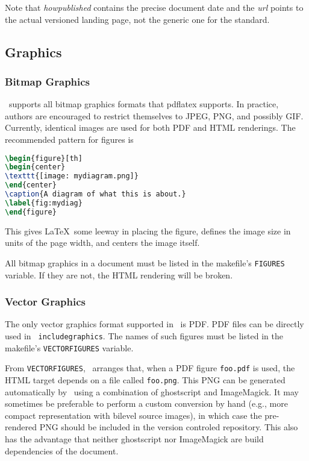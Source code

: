 \documentclass[11pt,a4paper]{ivoa}
\newcommand{\texword}[1]{\texttt{\color{texcolor} #1}}
\begin{document}
Note that \emph{howpublished} contains the precise document date and the
\emph{url} points to the actual versioned landing page, not the generic
one for the standard.

\subsection{Graphics}

\subsubsection{Bitmap Graphics}

\ivoatex\ supports all bitmap graphics formats that pdflatex supports.
In practice, authors are encouraged to restrict themselves to JPEG, PNG,
and possibly GIF.  Currently, identical images are used for both PDF and
HTML renderings.  The recommended pattern for figures is
\begin{lstlisting}[language=tex]
\begin{figure}[th]
\begin{center}
\texttt{[image: mydiagram.png]}
\end{center}
\caption{A diagram of what this is about.}
\label{fig:mydiag}
\end{figure}
\end{lstlisting}
This gives \LaTeX\ some leeway in placing the figure, defines the image
size in units of the page width, and centers the image itself.

All bitmap graphics in a document must  be listed in the makefile's
\texttt{FIGURES} variable.  If they are not, the HTML rendering will be
broken.

\subsubsection{Vector Graphics}
\label{sect:vectorgraphics}

The only vector graphics format supported in \ivoatex\ is PDF.  PDF
files can be directly used in \texword{includegraphics}.  The names of
such figures must be listed in the makefile's \texttt{VECTORFIGURES}
variable.

From \texttt{VECTORFIGURES}, \ivoatex\ arranges that, when a PDF figure 
\texttt{foo.pdf} is used, the HTML target depends on a file called
\texttt{foo.png}.  This PNG can be generated automatically by
\ivoatex\ using a combination of ghostscript and ImageMagick.  It may
sometimes be preferable to perform a custom conversion by hand (e.g.,
more compact representation with bilevel source images), in which case
the pre-rendered PNG should be included in the version controled
repository.  This also
has the advantage that neither ghostscript nor ImageMagick are build
dependencies of the document.
\end{document}
